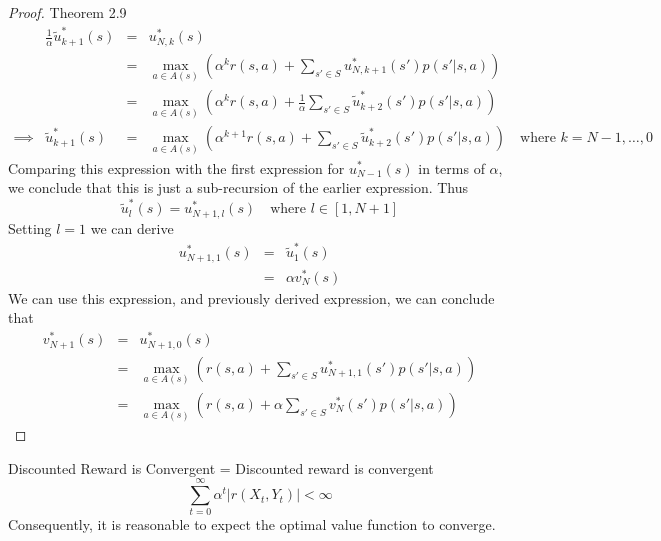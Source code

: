 \documentclass[11pt,a4paper]{article}
\begin{document}
\begin{proof}{Theorem 2.9}
    \[\begin{array}{rrcl}
      &\frac1\alpha\tilde{u}_{k+1}^*(s)&=&u_{N,k}^*(s)\\
      &&=&\max_{a\in A(s)}\left(\alpha^kr(s,a)+\sum_{s'\in S}u_{N,k+1}^*(s')p(s'|s,a)\right)\\
      &&=&\max_{a\in A(s)}\left(\alpha^kr(s,a)+\frac1\alpha\sum_{s'\in S}\tilde{u}_{k+2}^*(s')p(s'|s,a)\right)\\
      \implies&\tilde{u}_{k+1}^*(s)&=&\max_{a\in A(s)}\left(\alpha^{k+1}r(s,a)+\sum_{s'\in S}\tilde{u}_{k+2}^*(s')p(s'|s,a)\right)\quad\text{where }k=N-1,\dots,0
    \end{array}\]
    Comparing this expression with the first expression for $u_{N-1}^*(s)$ in terms of $\alpha$, we conclude that this is just a sub-recursion of the earlier expression. Thus
    \[ \tilde{u}_l^*(s)=u_{N+1,l}^*(s)\quad\text{where }l\in[1,N+1] \]
    Setting $l=1$ we can derive
    \[\begin{array}{rcl}
      u_{N+1,1}^*(s)&=&\tilde{u}_1^*(s)\\
      &=&\alpha v_N^*(s)
    \end{array}\]
    We can use this expression, and previously derived expression, we can conclude that
    \[\begin{array}{rcl}
      v_{N+1}^*(s)&=&u_{N+1,0}^*(s)\\
      &=&\max_{a\in A(s)}\left(r(s,a)+\sum_{s'\in S}u_{N+1,1}^*(s')p(s'|s,a)\right)\\
      &=&\max_{a\in A(s)}\left(r(s,a)+\alpha\sum_{s'\in S}v_N^*(s')p(s'|s,a)\right)
    \end{array}\]
    \proved
  \end{proof}

  \begin{proposition}{Discounted Reward is Convergent}
    \everymath={\displaystyle}
    Discounted reward is convergent
    \[ \sum_{t=0}^\infty\alpha^t|r(X_t,Y_t)|<\infty \]
    Consequently, it is reasonable to expect the optimal value function to converge.
  \end{proposition}
\end{document}
